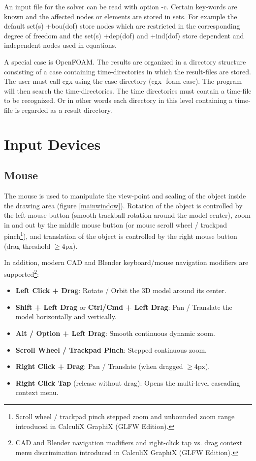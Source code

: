\documentclass{article}
\begin{document}
An input file for the solver can be read with option -c. Certain key-words are known and the affected nodes or elements are stored in sets. For example the default set(s) +bou(dof) store nodes which are restricted in the corresponding degree of freedom and the set(s) +dep(dof) and +ind(dof) store dependent and independent nodes used in equations.

A special case is OpenFOAM. The results are organized in a directory structure consisting of a case containing time-directories in which the result-files are stored. The user must call cgx using the case-directory (cgx -foam case). The program will then search the time-directories. The time directories must contain a time-file to be recognized. Or in other words each directory in this level containing a time-file is regarded as a result directory.

\section{\label{Input Devices}Input Devices}

\subsection{\label{Mouse}Mouse}
The mouse is used to manipulate the view-point and scaling of the object inside the drawing area (figure \ref{mainwindow}). Rotation of the object is controlled by the left mouse button (smooth trackball rotation around the model center), zoom in and out by the middle mouse button (or mouse scroll wheel / trackpad pinch\footnote{Scroll wheel / trackpad pinch stepped zoom and unbounded zoom range introduced in CalculiX GraphiX (GLFW Edition).}), and translation of the object is controlled by the right mouse button (drag threshold $\ge 4\text{px}$).

In addition, modern CAD and Blender keyboard/mouse navigation modifiers are supported\footnote{CAD and Blender navigation modifiers and right-click tap vs. drag context menu discrimination introduced in CalculiX GraphiX (GLFW Edition).}:
\begin{itemize}
\item \textbf{Left Click + Drag}: Rotate / Orbit the 3D model around its center.
\item \textbf{Shift + Left Drag} or \textbf{Ctrl/Cmd + Left Drag}: Pan / Translate the model horizontally and vertically.
\item \textbf{Alt / Option + Left Drag}: Smooth continuous dynamic zoom.
\item \textbf{Scroll Wheel / Trackpad Pinch}: Stepped continuous zoom.
\item \textbf{Right Click + Drag}: Pan / Translate (when dragged $\ge 4\text{px}$).
\item \textbf{Right Click Tap} (release without drag): Opens the multi-level cascading context menu.
\end{itemize}
\end{document}

